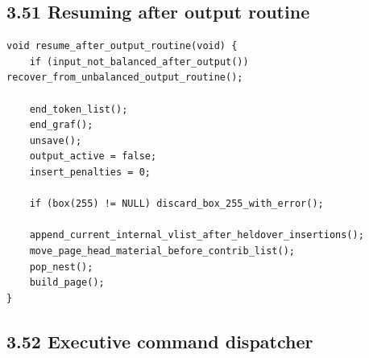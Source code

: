 \documentclass[11pt]{article}
\begin{document}
\subsection{3.51 Resuming after output
routine}\label{resuming-after-output-routine}

\begin{verbatim}
void resume_after_output_routine(void) {
    if (input_not_balanced_after_output()) recover_from_unbalanced_output_routine();

    end_token_list();
    end_graf();
    unsave();
    output_active = false;
    insert_penalties = 0;

    if (box(255) != NULL) discard_box_255_with_error();

    append_current_internal_vlist_after_heldover_insertions();
    move_page_head_material_before_contrib_list();
    pop_nest();
    build_page();
}
\end{verbatim}

\subsection{3.52 Executive command
dispatcher}\label{executive-command-dispatcher}
\end{document}
